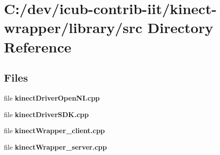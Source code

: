 \section{C\+:/dev/icub-\/contrib-\/iit/kinect-\/wrapper/library/src Directory Reference}
\label{dir_255fa8f554e95a439f260058328638ab}
\subsection*{Files}
\begin{DoxyCompactItemize}
\item 
file {\bfseries kinect\+Driver\+Open\+N\+I.\+cpp}
\item 
file {\bfseries kinect\+Driver\+S\+D\+K.\+cpp}
\item 
file {\bfseries kinect\+Wrapper\+\_\+client.\+cpp}
\item 
file {\bfseries kinect\+Wrapper\+\_\+server.\+cpp}
\end{DoxyCompactItemize}
